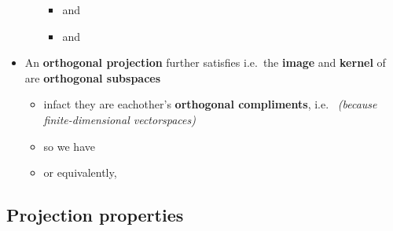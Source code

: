 \begin{itemize}
\begin{itemize}
                \begin{itemize}

                  \item
                         and 
                  \item
                         and
                \end{itemize}
        \end{itemize}
  \item
        An \textbf{orthogonal projection} further satisfies 
        i.e.~the \textbf{image} and \textbf{kernel} of \iMbox{\pi} are
        \textbf{orthogonal subspaces}

        \begin{itemize}

          \item
                infact they are eachother's \textbf{orthogonal compliments},
                i.e.~ \emph{(because
                  finite-dimensional vectorspaces)}
          \item
                so we have
          \item
                or equivalently,
        \end{itemize}
\end{itemize}

\subsection*{Projection properties}

